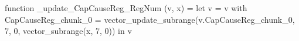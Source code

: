 function _update_CapCauseReg_RegNum (v, x) = let v = { v with CapCauseReg_chunk_0 = vector_update_subrange(v.CapCauseReg_chunk_0, 7, 0, vector_subrange(x, 7, 0)) } in v

